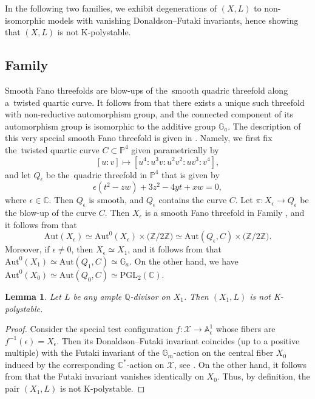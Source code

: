 \documentclass[12pt]{amsart}
\newtheorem{lemma}[theorem]{Lemma}
\theoremstyle{definition}
\theoremstyle{remark}
\begin{document}
In the following two families, we exhibit degenerations of $(X,L)$ to non-isomorphic models with vanishing Donaldson--Futaki invariants, hence showing that $(X,L)$ is not K-polystable.



\subsection{Family }
\label{subsection:2-21}

Smooth Fano threefolds  are blow-ups of the~smooth quadric threefold along a~twisted quartic curve.
It follows from \cite{CheltsovShramovPrzyjalkowski} that there exists a unique such threefold with non-reductive automorphism group,
and the connected component of its automorphism group is isomorphic to the additive group $\mathbb{G}_a$.
The description of this very special smooth Fano threefold is given in \cite{Book,Malbon}.
Namely, we first fix the~twisted quartic curve $C\subset\mathbb{P}^4$ given parametrically by
$$
[u:v]\mapsto[u^4:u^3v:u^2v^2:uv^3:v^4],
$$
and let $Q_{\epsilon}$ be the~quadric threefold in $\mathbb{P}^4$ that is given by
$$
\epsilon(t^2-zw)+3z^2-4yt+xw=0,
$$
where $\epsilon\in\mathbb{C}$.
Then $Q_{\epsilon}$ is smooth, and $Q_{\epsilon}$ contains the curve $C$.
Let $\pi\colon X_{\epsilon}\to Q_{\epsilon}$ be the blow-up of the curve $C$.
Then $X_{\epsilon}$ is a smooth Fano threefold in Family , and it follows from \cite{Malbon} that
$$
\mathrm{Aut}(X_\epsilon)\simeq\mathrm{Aut}^0(X_\epsilon)\times\big(\mathbb{Z}/2\mathbb{Z}\big)\simeq\mathrm{Aut}(Q_{\epsilon},C)\times\big(\mathbb{Z}/2\mathbb{Z}\big).
$$
Moreover, if $\epsilon \ne 0$, then $X_{\epsilon}\simeq X_{1}$, and it follows from \cite{Malbon} that
$
\mathrm{Aut}^0(X_1)\simeq\mathrm{Aut}(Q_1,C)\simeq\mathbb{G}_a
$.
On the other hand, we have $\mathrm{Aut}^0(X_0)\simeq\mathrm{Aut}(Q_0,C)\simeq\mathrm{PGL}_{2}(\mathbb{C})$.

\begin{lemma}
\label{lemma:2-21}
Let $L$ be any ample $\mathbb{Q}$-divisor on $X_1$. Then $(X_1,L)$ is not K-polystable.
\end{lemma}

\begin{proof}
Consider the special test configuration $f\colon \mathcal{X}\to\mathbb{A}^1_{\epsilon}$ whose fibers are $f^{-1}(\epsilon)=X_{\epsilon}$. Then its Donaldson--Futaki invariant coincides (up to a positive multiple) with the Futaki invariant of the $\mathbb{G}_m$-action on the central fiber $X_0$ induced by the corresponding $\mathbb{C}^\ast$-action on $\mathcal{X}$, see \cite{Donaldson2002,Legendre}. On the other hand, it follows from \cite{SektnanTipler} that the Futaki invariant vanishes identically on $X_0$. Thus, by definition, the pair $(X_1,L)$ is not K-polystable.
\end{proof}
\end{document}
